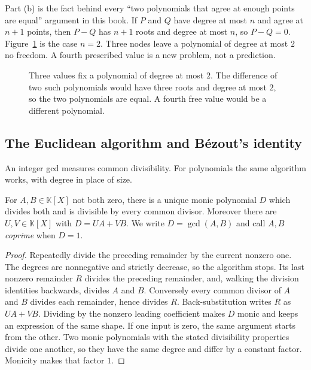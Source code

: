 Part (b) is the fact behind every ``two polynomials that agree at enough points are equal'' argument in this book. If $P$ and $Q$ have degree at most $n$ and agree at $n+1$ points, then $P-Q$ has $n+1$ roots and degree at most $n$, so $P-Q=0$. Figure~\ref{fig:threepoints} is the case $n=2$. Three nodes leave a polynomial of degree at most $2$ no freedom. A fourth prescribed value is a new problem, not a prediction.

\begin{figure}[ht]
\centering
{}
\caption{Three values fix a polynomial of degree at most $2$. The difference of two such polynomials would have three roots and degree at most $2$, so the two polynomials are equal. A fourth free value would be a different polynomial.}
\label{fig:threepoints}
\end{figure}

\subsection*{The Euclidean algorithm and B\'ezout's identity}
An integer gcd measures common divisibility. For polynomials the same algorithm works, with degree in place of size.

\begin{proposition}\label{prop:polynomial-bezout}
For $A,B\in\mathbb K[X]$ not both zero, there is a unique monic polynomial $D$ which divides both and is divisible by every common divisor. Moreover there are $U,V\in\mathbb K[X]$ with $D=UA+VB$. We write $D=\gcd(A,B)$ and call $A,B$ \emph{coprime} when $D=1$.
\end{proposition}
\begin{proof}
Repeatedly divide the preceding remainder by the current nonzero one. The degrees are nonnegative and strictly decrease, so the algorithm stops. Its last nonzero remainder $R$ divides the preceding remainder, and, walking the division identities backwards, divides $A$ and $B$. Conversely every common divisor of $A$ and $B$ divides each remainder, hence divides $R$. Back-substitution writes $R$ as $UA+VB$. Dividing by the nonzero leading coefficient makes $D$ monic and keeps an expression of the same shape. If one input is zero, the same argument starts from the other. Two monic polynomials with the stated divisibility properties divide one another, so they have the same degree and differ by a constant factor. Monicity makes that factor $1$.
\end{proof}

